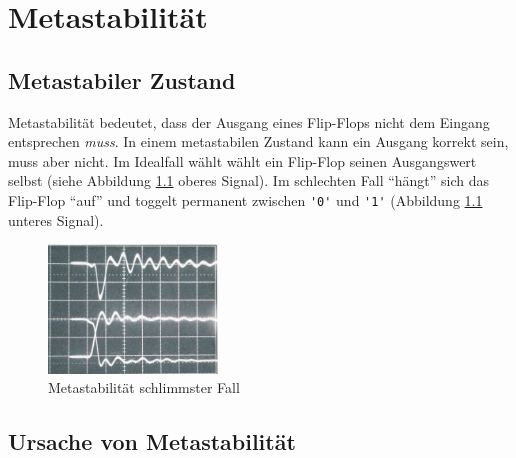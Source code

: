 
\chapter{Metastabilität}\label{chap.metastabilitat}

\section{Metastabiler Zustand}\label{sect.meatastabil_def}

Metastabilität bedeutet, dass der Ausgang eines Flip-Flops nicht dem Eingang entsprechen \textit{muss}. In einem metastabilen Zustand kann ein Ausgang korrekt sein, muss aber nicht.
Im Idealfall wählt wählt ein Flip-Flop seinen Ausgangswert selbst (siehe Abbildung \ref{fig.metastabil.schlimmster_Fall} oberes Signal). Im schlechten Fall ``hängt'' sich das Flip-Flop “auf” und toggelt permanent zwischen \lstinline|'0'| und \lstinline|'1'| (Abbildung \ref{fig.metastabil.schlimmster_Fall} unteres Signal).

\begin{figure}[H]
	\includegraphics[width=0.4\textwidth]{images/metastability/metastability_2_IO.png}
	\caption{Metastabilität schlimmster Fall \citep{F_metastability}}
	\label{fig.metastabil.schlimmster_Fall}
\end{figure}


\section{Ursache von Metastabilität}\label{sect.meatastabil_ursache}

